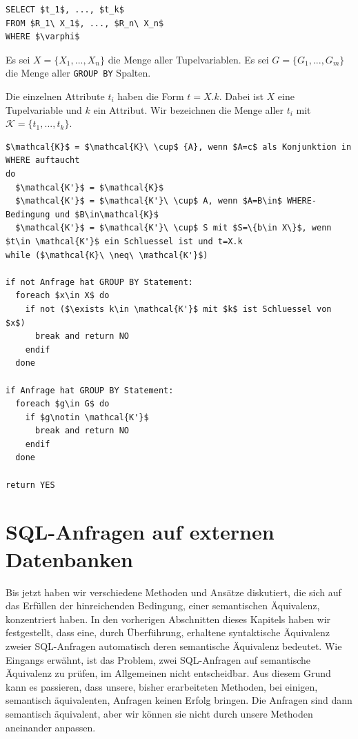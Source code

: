 \begin{lstlisting}[mathescape]
SELECT $t_1$, ..., $t_k$
FROM $R_1\ X_1$, ..., $R_n\ X_n$
WHERE $\varphi$
\end{lstlisting}

Es sei $X=\{X_1, ..., X_n\}$ die Menge aller Tupelvariablen. Es sei $G=\{G_1, ..., G_m\}$ die Menge aller \verb|GROUP BY| Spalten.

Die einzelnen Attribute $t_i$ haben die Form $t = X.k$. Dabei ist $X$ eine Tupelvariable und $k$ ein Attribut. Wir bezeichnen die Menge aller $t_i$ mit $\mathcal{K}=\{t_1,...,t_k\}$.

\begin{lstlisting}[mathescape]
$\mathcal{K}$ = $\mathcal{K}\ \cup$ {A}, wenn $A=c$ als Konjunktion in WHERE auftaucht
do 
  $\mathcal{K'}$ = $\mathcal{K}$
  $\mathcal{K'}$ = $\mathcal{K'}\ \cup$ A, wenn $A=B\in$ WHERE-Bedingung und $B\in\mathcal{K}$
  $\mathcal{K'}$ = $\mathcal{K'}\ \cup$ S mit $S=\{b\in X\}$, wenn $t\in \mathcal{K'}$ ein Schluessel ist und t=X.k
while ($\mathcal{K}\ \neq\ \mathcal{K'}$)

if not Anfrage hat GROUP BY Statement:
  foreach $x\in X$ do
    if not ($\exists k\in \mathcal{K'}$ mit $k$ ist Schluessel von $x$)
      break and return NO
    endif
  done

if Anfrage hat GROUP BY Statement:
  foreach $g\in G$ do
    if $g\notin \mathcal{K'}$
      break and return NO
    endif
  done

return YES
\end{lstlisting}


\section{SQL-Anfragen auf externen Datenbanken}

Bis jetzt haben wir verschiedene Methoden und Ansätze diskutiert, die sich auf das Erfüllen der hinreichenden Bedingung, einer semantischen Äquivalenz, konzentriert haben. In den vorherigen Abschnitten dieses Kapitels haben wir festgestellt, dass eine, durch Überführung, erhaltene syntaktische Äquivalenz zweier SQL-Anfragen automatisch deren semantische Äquivalenz bedeutet. Wie Eingangs erwähnt, ist das Problem, zwei SQL-Anfragen auf semantische Äquivalenz zu prüfen, im Allgemeinen nicht entscheidbar. Aus diesem Grund kann es passieren, dass unsere, bisher erarbeiteten Methoden, bei einigen, semantisch äquivalenten, Anfragen keinen Erfolg bringen. Die Anfragen sind dann semantisch äquivalent, aber wir können sie nicht durch unsere Methoden aneinander anpassen. 

